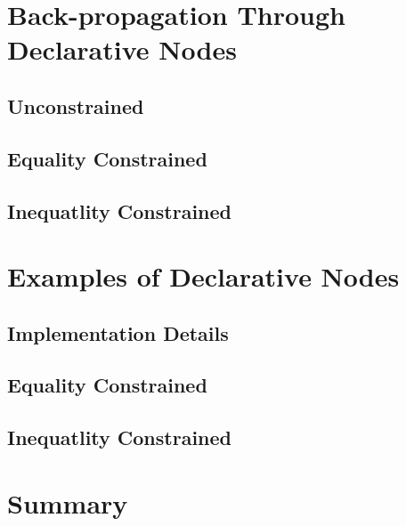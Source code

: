 \section{Back-propagation Through Declarative Nodes}
\label{sec:bp}

\subsection{Unconstrained}
\subsection{Equality Constrained}
\subsection{Inequatlity Constrained}

\section{Examples of Declarative Nodes}
\label{sec:example}

\subsection{Implementation Details}
\subsection{Equality Constrained}

\subsection{Inequatlity Constrained}

\section{Summary}
